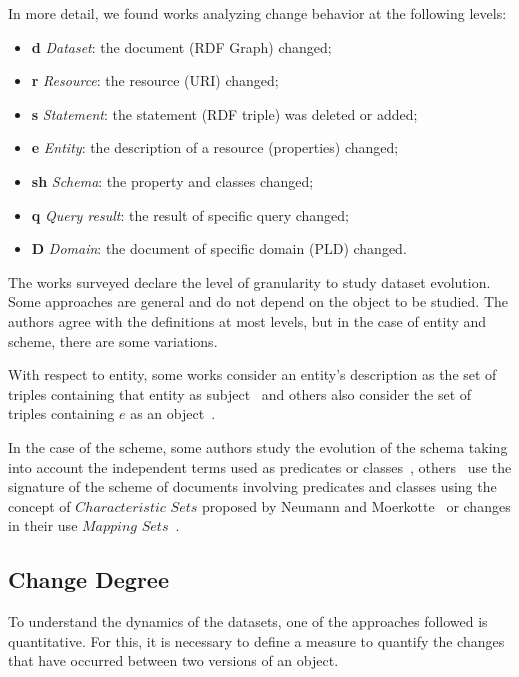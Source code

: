 \documentclass[sw]{iosart2x}
\begin{document}
In more detail, we found works analyzing change behavior at the following levels:
\begin{itemize}
	\item \textbf{d} \textit{Dataset}: the document (RDF Graph) changed;
	\item \textbf{r} \textit{Resource}: the resource (URI) changed;
	\item \textbf{s} \textit{Statement}: the statement (RDF triple) was deleted or added;
	\item \textbf{e} \textit{Entity}: the description of a resource (properties) changed;
	\item \textbf{sh} \textit{Schema}: the property and classes changed;
	\item \textbf{q} \textit{Query result}: the result of specific query changed;
	\item \textbf{D} \textit{Domain}: the document of specific domain (PLD) changed.
\end{itemize}

The works surveyed declare the level of granularity to study dataset evolution. Some approaches are general and do not depend on the object to be studied. The authors agree with the definitions at most levels, but in the case of entity and scheme, there are some variations.

With respect to entity, some works consider an entity's description as the set of triples containing that entity as subject~\cite{UmbrichKL10, NishiokaS15, NishiokaS16, GonzalezH18, DividinoSGG13} and others also consider the set of triples containing $e$ as an object~\cite{UmbrichHHPD10, NishiokaS16}.

In the case of the scheme, some authors study the evolution of the schema taking into account the independent terms used as predicates or classes~\cite{KaferAUOH13, KaferWA17}, others~\cite{DividinoSGG13, GonzalezH18} use the signature of the scheme of documents involving predicates and classes using the concept of $Characteristic$ $Sets$ proposed by Neumann and Moerkotte~\cite{NeumannM11} or changes in their use $Mapping$ $Sets$~\cite{DividinoSGG13}.

\subsection{Change Degree}\label{Detection}

To understand the dynamics of the datasets, one of the approaches followed is quantitative. For this, it is necessary to define a measure to quantify the changes that have occurred between two versions of an object.
\end{document}
